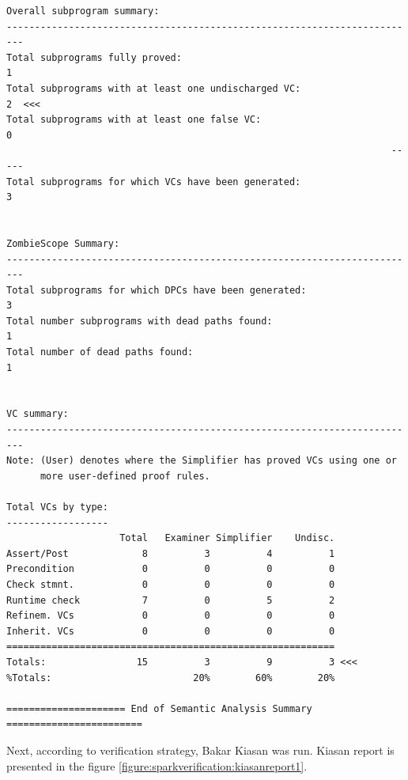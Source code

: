 \begin{lstlisting}[frame=single, gobble=0, caption={POGS report}, label={listing:pcapump_dosemonitor_pogs}]
Overall subprogram summary:
-------------------------------------------------------------------------
Total subprograms fully proved:                                         1
Total subprograms with at least one undischarged VC:                    2  <<<
Total subprograms with at least one false VC:                           0
                                                                    -----
Total subprograms for which VCs have been generated:                    3


ZombieScope Summary:
-------------------------------------------------------------------------
Total subprograms for which DPCs have been generated:                   3
Total number subprograms with dead paths found:                         1
Total number of dead paths found:                                       1


VC summary:
-------------------------------------------------------------------------
Note: (User) denotes where the Simplifier has proved VCs using one or
      more user-defined proof rules.

Total VCs by type:
------------------
                    Total   Examiner Simplifier    Undisc.
Assert/Post             8          3          4          1
Precondition            0          0          0          0
Check stmnt.            0          0          0          0
Runtime check           7          0          5          2
Refinem. VCs            0          0          0          0
Inherit. VCs            0          0          0          0
==========================================================
Totals:                15          3          9          3 <<<
%Totals:                         20%        60%        20%

===================== End of Semantic Analysis Summary ========================
\end{lstlisting}
\doublespacing

Next, according to verification strategy, Bakar Kiasan was run. Kiasan report is presented in the figure \ref{figure:sparkverification:kiasanreport1}.

